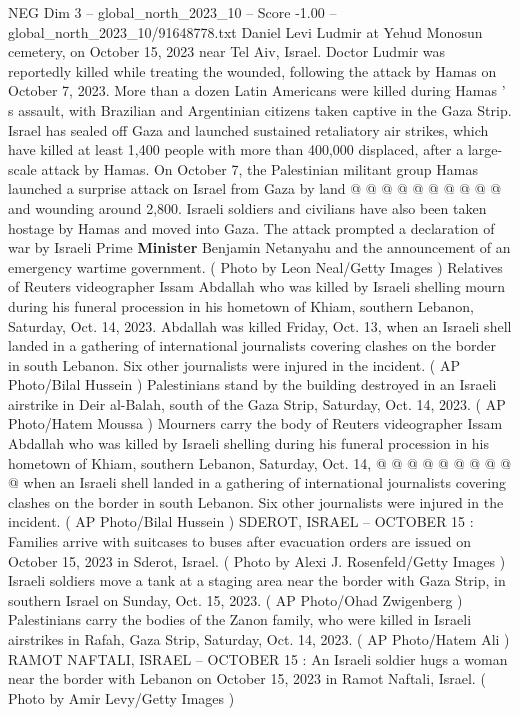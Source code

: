 \begin{textsample}{NEG Dim 3 – global\_north\_2023\_10 – Score -1.00 – global\_north\_2023\_10/91648778.txt}
Daniel Levi Ludmir at Yehud Monosun cemetery, on October 15, 2023 near Tel Aiv, Israel.
Doctor Ludmir was reportedly killed while treating the wounded, following the attack by Hamas on October 7, 2023.
More than a dozen Latin Americans were killed during Hamas ' s assault, with Brazilian and Argentinian citizens taken captive in the Gaza Strip.
Israel has sealed off Gaza and launched sustained retaliatory air strikes, which have killed at least 1,400 people with more than 400,000 displaced, after a large-scale attack by Hamas.
On October 7, the Palestinian militant group Hamas launched a surprise attack on Israel from Gaza by land @ @ @ @ @ @ @ @ @ @ and wounding around 2,800.
Israeli soldiers and civilians have also been taken hostage by Hamas and moved into Gaza.
The attack prompted a declaration of war by Israeli Prime \textbf{Minister} Benjamin Netanyahu and the announcement of an emergency wartime government. ( Photo by Leon Neal/Getty Images ) Relatives of Reuters videographer Issam Abdallah who was killed by Israeli shelling mourn during his funeral procession in his hometown of Khiam, southern Lebanon, Saturday, Oct. 14, 2023.
Abdallah was killed Friday, Oct. 13, when an Israeli shell landed in a gathering of international journalists covering clashes on the border in south Lebanon.
Six other journalists were injured in the incident. ( AP Photo/Bilal Hussein ) Palestinians stand by the building destroyed in an Israeli airstrike in Deir al-Balah, south of the Gaza Strip, Saturday, Oct. 14, 2023. ( AP Photo/Hatem Moussa ) Mourners carry the body of Reuters videographer Issam Abdallah who was killed by Israeli shelling during his funeral procession in his hometown of Khiam, southern Lebanon, Saturday, Oct. 14, @ @ @ @ @ @ @ @ @ @ when an Israeli shell landed in a gathering of international journalists covering clashes on the border in south Lebanon.
Six other journalists were injured in the incident. ( AP Photo/Bilal Hussein ) SDEROT, ISRAEL -- OCTOBER 15 : Families arrive with suitcases to buses after evacuation orders are issued on October 15, 2023 in Sderot, Israel. ( Photo by Alexi J.
Rosenfeld/Getty Images ) Israeli soldiers move a tank at a staging area near the border with Gaza Strip, in southern Israel on Sunday, Oct. 15, 2023. ( AP Photo/Ohad Zwigenberg ) Palestinians carry the bodies of the Zanon family, who were killed in Israeli airstrikes in Rafah, Gaza Strip, Saturday, Oct. 14, 2023. ( AP Photo/Hatem Ali ) RAMOT NAFTALI, ISRAEL -- OCTOBER 15 : An Israeli soldier hugs a woman near the border with Lebanon on October 15, 2023 in Ramot Naftali, Israel. ( Photo by Amir Levy/Getty Images )

\end{textsample}

